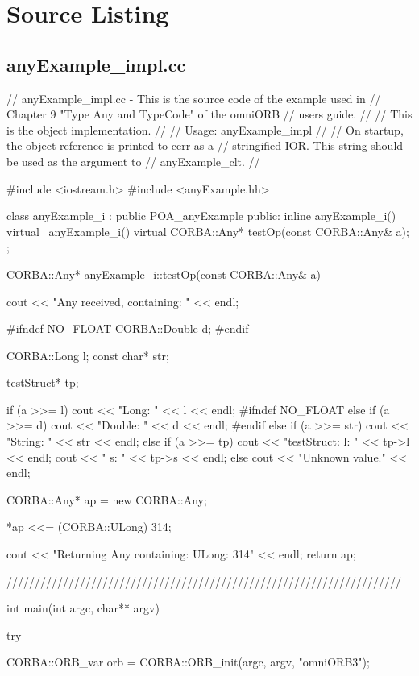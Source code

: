 \documentclass[11pt,twoside,a4paper]{book}
\begin{document}
\clearpage

\section{Source Listing}

\subsection{anyExample\_impl.cc}

\begin{cxxlisting}
// anyExample_impl.cc - This is the source code of the example used in
//                      Chapter 9 "Type Any and TypeCode" of the omniORB
//                      users guide.
//
//                      This is the object implementation.
//
// Usage: anyExample_impl
//
//        On startup, the object reference is printed to cerr as a
//        stringified IOR. This string should be used as the argument to 
//        anyExample_clt.
//

#include <iostream.h>
#include <anyExample.hh>

class anyExample_i : public POA_anyExample {
public:
  inline anyExample_i() {}
  virtual ~anyExample_i() {}
  virtual CORBA::Any* testOp(const CORBA::Any& a);
};

CORBA::Any* anyExample_i::testOp(const CORBA::Any& a)
{
  cout << "Any received, containing: " << endl;

#ifndef NO_FLOAT
  CORBA::Double d;
#endif

  CORBA::Long l;
  const char* str;

  testStruct* tp;

  if (a >>= l) {
    cout << "Long: " << l << endl;
  }
#ifndef NO_FLOAT
  else if (a >>= d) {
    cout << "Double: " << d << endl;
  }
#endif
  else if (a >>= str) {
    cout << "String: " << str << endl;
  }
  else if (a >>= tp) {
    cout << "testStruct: l: " << tp->l << endl;
    cout << "            s: " << tp->s << endl;
  }
  else {
    cout << "Unknown value." << endl;
  }

  CORBA::Any* ap = new CORBA::Any;

  *ap <<= (CORBA::ULong) 314;

  cout << "Returning Any containing: ULong: 314\n" << endl;
  return ap;
}

//////////////////////////////////////////////////////////////////////

int main(int argc, char** argv)
{
  try {
    CORBA::ORB_var orb = CORBA::ORB_init(argc, argv, "omniORB3");

}}
\end{cxxlisting}
\end{document}
